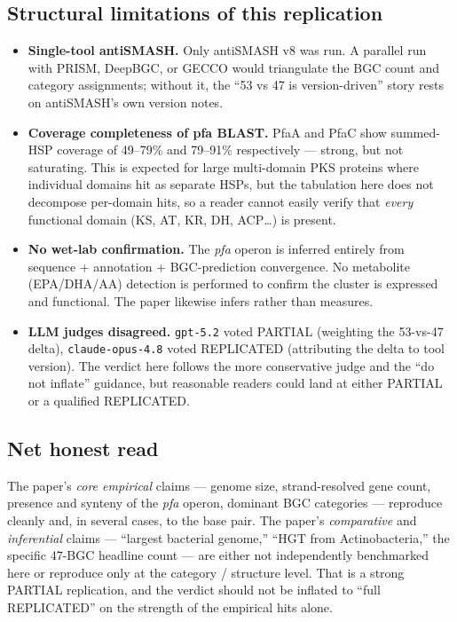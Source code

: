 \documentclass[11pt,a4paper]{article}
\begin{document}
\subsection{Structural limitations of this replication}
\begin{itemize}[leftmargin=1.2cm]
\item \textbf{Single-tool antiSMASH.} Only antiSMASH v8 was run. A parallel run with PRISM, DeepBGC, or GECCO would triangulate the BGC count and category assignments; without it, the ``53 vs 47 is version-driven'' story rests on antiSMASH's own version notes.
\item \textbf{Coverage completeness of pfa BLAST.} PfaA and PfaC show summed-HSP coverage of 49--79\% and 79--91\% respectively --- strong, but not saturating. This is expected for large multi-domain PKS proteins where individual domains hit as separate HSPs, but the tabulation here does not decompose per-domain hits, so a reader cannot easily verify that \emph{every} functional domain (KS, AT, KR, DH, ACP\ldots) is present.
\item \textbf{No wet-lab confirmation.} The \textit{pfa} operon is inferred entirely from sequence + annotation + BGC-prediction convergence. No metabolite (EPA/DHA/AA) detection is performed to confirm the cluster is expressed and functional. The paper likewise infers rather than measures.
\item \textbf{LLM judges disagreed.} \texttt{gpt-5.2} voted PARTIAL (weighting the 53-vs-47 delta), \texttt{claude-opus-4.8} voted REPLICATED (attributing the delta to tool version). The verdict here follows the more conservative judge and the ``do not inflate'' guidance, but reasonable readers could land at either PARTIAL or a qualified REPLICATED.
\end{itemize}

\subsection{Net honest read}
The paper's \emph{core empirical} claims --- genome size, strand-resolved gene count, presence and synteny of the \textit{pfa} operon, dominant BGC categories --- reproduce cleanly and, in several cases, to the base pair. The paper's \emph{comparative} and \emph{inferential} claims --- ``largest bacterial genome,'' ``HGT from Actinobacteria,'' the specific 47-BGC headline count --- are either not independently benchmarked here or reproduce only at the category / structure level. That is a strong PARTIAL replication, and the verdict should not be inflated to ``full REPLICATED'' on the strength of the empirical hits alone.
\end{document}
